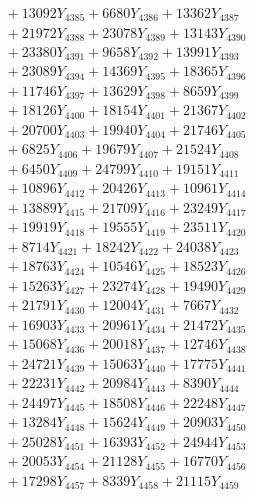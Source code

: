 \documentclass[a4paper,10pt]{article}
\begin{document}
{\begin{align}
&\;  + 13092 Y_{4385} + 6680 Y_{4386} + 13362 Y_{4387} \\[0.3ex]
&\;  + 21972 Y_{4388} + 23078 Y_{4389} + 13143 Y_{4390} \\[0.3ex]
&\;  + 23380 Y_{4391} + 9658 Y_{4392} + 13991 Y_{4393} \\[0.3ex]
&\;  + 23089 Y_{4394} + 14369 Y_{4395} + 18365 Y_{4396} \\[0.3ex]
&\;  + 11746 Y_{4397} + 13629 Y_{4398} + 8659 Y_{4399} \\[0.3ex]
&\;  + 18126 Y_{4400} + 18154 Y_{4401} + 21367 Y_{4402} \\[0.3ex]
&\;  + 20700 Y_{4403} + 19940 Y_{4404} + 21746 Y_{4405} \\[0.3ex]
&\;  + 6825 Y_{4406} + 19679 Y_{4407} + 21524 Y_{4408} \\[0.5ex]\allowbreak
&\;  + 6450 Y_{4409} + 24799 Y_{4410} + 19151 Y_{4411} \\[0.3ex]
&\;  + 10896 Y_{4412} + 20426 Y_{4413} + 10961 Y_{4414} \\[0.3ex]
&\;  + 13889 Y_{4415} + 21709 Y_{4416} + 23249 Y_{4417} \\[0.3ex]
&\;  + 19919 Y_{4418} + 19555 Y_{4419} + 23511 Y_{4420} \\[0.3ex]
&\;  + 8714 Y_{4421} + 18242 Y_{4422} + 24038 Y_{4423} \\[0.3ex]
&\;  + 18763 Y_{4424} + 10546 Y_{4425} + 18523 Y_{4426} \\[0.3ex]
&\;  + 15263 Y_{4427} + 23274 Y_{4428} + 19490 Y_{4429} \\[0.3ex]
&\;  + 21791 Y_{4430} + 12004 Y_{4431} + 7667 Y_{4432} \\[0.3ex]
&\;  + 16903 Y_{4433} + 20961 Y_{4434} + 21472 Y_{4435} \\[0.3ex]
&\;  + 15068 Y_{4436} + 20018 Y_{4437} + 12746 Y_{4438} \\[0.5ex]\allowbreak
&\;  + 24721 Y_{4439} + 15063 Y_{4440} + 17775 Y_{4441} \\[0.3ex]
&\;  + 22231 Y_{4442} + 20984 Y_{4443} + 8390 Y_{4444} \\[0.3ex]
&\;  + 24497 Y_{4445} + 18508 Y_{4446} + 22248 Y_{4447} \\[0.3ex]
&\;  + 13284 Y_{4448} + 15624 Y_{4449} + 20903 Y_{4450} \\[0.3ex]
&\;  + 25028 Y_{4451} + 16393 Y_{4452} + 24944 Y_{4453} \\[0.3ex]
&\;  + 20053 Y_{4454} + 21128 Y_{4455} + 16770 Y_{4456} \\[0.3ex]
&\;  + 17298 Y_{4457} + 8339 Y_{4458} + 21115 Y_{4459} \\[0.3ex]

\end{align}}
\end{document}

